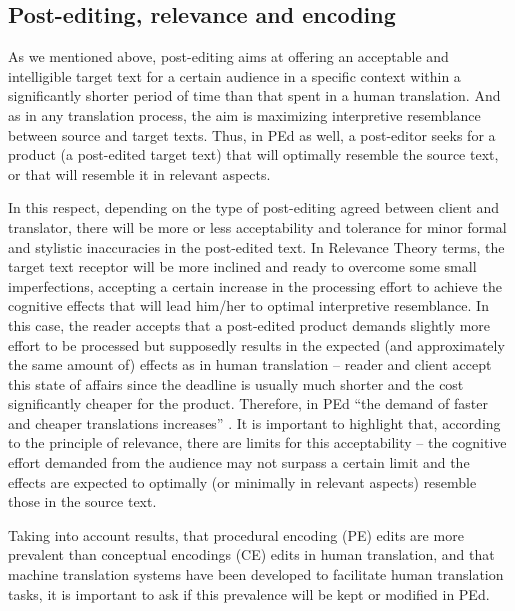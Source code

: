 \documentclass[output=paper]{langsci/langscibook}
\begin{document}
\subsection{Post-editing, relevance and encoding}

As we mentioned above, post-editing aims at offering an acceptable and intelligible target text for a certain audience in a specific context within a significantly shorter period of time than that spent in a human translation. And as in any translation process, the aim is maximizing interpretive resemblance between source and target texts. Thus, in PEd as well, a post-editor seeks for a product (a post-edited target text) that will optimally resemble the source text, or that will resemble it in relevant aspects. 


In this respect, depending on the type of post-editing agreed between client and translator, there will be more or less acceptability and tolerance for minor formal and stylistic inaccuracies in the post-edited text. In Relevance Theory terms, the target text receptor will be more inclined and ready to overcome some small imperfections, accepting a certain increase in the processing effort to achieve the cognitive effects that will lead him/her to optimal interpretive resemblance. In this case, the reader accepts that a post-edited product demands slightly more effort to be processed but supposedly results in the expected (and approximately the same amount of) effects as in human translation – reader and client accept this state of affairs since the deadline is usually much shorter and the cost significantly cheaper for the product. Therefore, in PEd “the demand of faster and cheaper translations increases” \citep[p. 171]{aziz2014}. It is important to highlight that, according to the principle of relevance, there are limits for this acceptability – the cognitive effort demanded from the audience may not surpass a certain limit and the effects are expected to optimally (or minimally in relevant aspects) resemble those in the source text.



Taking into account \citet{alves2013} results, that procedural encoding (PE) edits are more prevalent than conceptual encodings (CE) edits in human translation, and that machine translation systems have been developed to facilitate human translation tasks, it is important to ask if this prevalence will be kept or modified in PEd.
\end{document}
